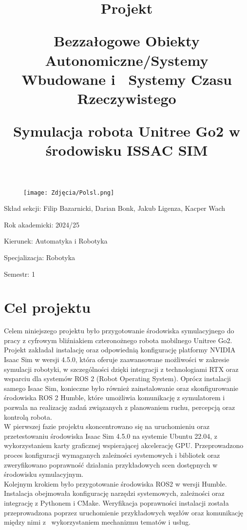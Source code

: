 \documentclass[12pt]{article}
\title{Projekt \par Bezzałogowe Obiekty Autonomiczne/Systemy Wbudowane i~ Systemy Czasu Rzeczywistego  \par \vspace{10pt} \textbf{Symulacja robota Unitree Go2 w środowisku ISSAC SIM}}
\date{}
\begin{document}
\begin{figure}[t]
\centering
    \texttt{[image: Zdjęcia/Polsl.png]}
\end{figure}

\maketitle
\vspace{150pt}
Skład sekcji: Filip Bazarnicki, Darian Bonk, Jakub Ligenza, Kacper Wach

Rok akademicki: 2024/25


Kierunek: Automatyka i Robotyka

Specjalizacja: Robotyka

Semestr: 1


\newpage
\renewcommand{\contentsname}{Spis treści}
\tableofcontents

\clearpage

\section{Cel projektu}

Celem niniejszego projektu było przygotowanie środowiska symulacyjnego do pracy z cyfrowym bliźniakiem czteronożnego robota mobilnego Unitree Go2.\\

\noindent Projekt zakładał instalację oraz odpowiednią konfigurację platformy NVIDIA Isaac Sim w wersji 4.5.0, która oferuje zaawansowane możliwości w zakresie symulacji robotyki, w szczególności dzięki integracji z technologiami RTX oraz wsparciu dla systemów ROS 2 (Robot Operating System). Oprócz instalacji samego Isaac Sim, konieczne było również zainstalowanie oraz skonfigurowanie środowiska ROS 2 Humble, które umożliwia komunikację z symulatorem i pozwala na realizację zadań związanych z planowaniem ruchu, percepcją oraz kontrolą robota.\\

\noindent W pierwszej fazie projektu skoncentrowano się na uruchomieniu oraz przetestowaniu środowiska Isaac Sim 4.5.0 na systemie Ubuntu 22.04, z wykorzystaniem karty graficznej wspierającej akcelerację GPU. Przeprowadzono proces konfiguracji wymaganych zależności systemowych i bibliotek oraz zweryfikowano poprawność działania przykładowych scen dostępnych w środowisku symulacyjnym.\\

\noindent Kolejnym krokiem było przygotowanie środowiska ROS2 w wersji Humble. Instalacja obejmowała konfigurację narzędzi systemowych, zależności oraz integrację z Pythonem i CMake. Weryfikacja poprawności instalacji została przeprowadzona poprzez uruchomienie przykładowych węzłów oraz komunikację między nimi z~ wykorzystaniem mechanizmu tematów i usług.\\
\end{document}
